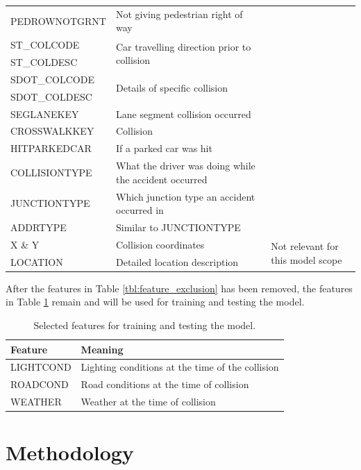 \documentclass[12pt,a4paper,oneside]{article}
\begin{document}
\begin{table}[htbp!]
\begin{tabularx}{\textwidth}{l X X}
        PEDROWNOTGRNT & Not giving pedestrian right of way & \\
        ST\_COLCODE & \multirow{2}{=}{Car travelling direction prior to collision} & \\
        ST\_COLDESC & \\
        SDOT\_COLCODE & \multirow{2}{=}{Details of specific collision} & \\ 
        SDOT\_COLDESC & \\
        SEGLANEKEY & Lane segment collision occurred & \\
        CROSSWALKKEY & Collision  & \\
        HITPARKEDCAR & If a parked car was hit & \\
        COLLISIONTYPE & What the driver was doing while the accident occurred & \\
        JUNCTIONTYPE & Which junction type an accident occurred in & \\
        ADDRTYPE & Similar to JUNCTIONTYPE & \\
        \midrule
        X \& Y & Collision coordinates & \multirow{2}{=}{Not relevant for this model scope} \\
        LOCATION & Detailed location description &  \\
        \bottomrule
    \end{tabularx}
\end{table}

After the features in Table \ref{tbl:feature_exclusion} has been removed, the features in Table \ref{tbl:feature_selection} remain and will be used for training and testing the model. 

\begin{table}[htbp!]
    \centering
    \caption{Selected features for training and testing the model.}
    \label{tbl:feature_selection}
    \begin{tabular}{l l}
        \toprule
        Feature & Meaning \\
        \midrule
        LIGHTCOND & Lighting conditions at the time of the collision \\
        ROADCOND & Road conditions at the time of collision \\
        WEATHER & Weather at the time of collision \\
        \bottomrule
    \end{tabular}
\end{table}

\section{Methodology}
\end{document}
